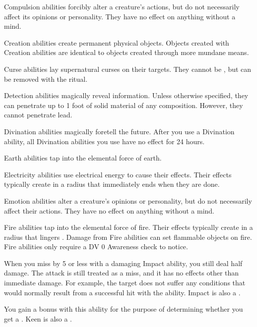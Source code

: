    Compulsion abilities forcibly alter a creature's actions, but do not necessarily affect its opinions or personality.
  They have no effect on anything without a mind.

   Creation abilities create permanent physical objects.
  Objects created with Creation abilities are identical to objects created through more mundane means.

   Curse abilities lay supernatural curses on their targets.
  They cannot be , but can be removed with the  ritual.

  \label{Detection} Detection abilities magically reveal information.
  Unless otherwise specified, they can penetrate up to 1 foot of solid material of any composition.
  However, they cannot penetrate lead.

  \label{Divination} Divination abilities magically foretell the future.
  After you use a Divination ability, all Divination abilities you use have no effect for 24 hours. 

   Earth abilities tap into the elemental force of earth.

   Electricity abilities use electrical energy to cause their effects.
  Their effects typically create  in a \smallarea radius that immediately ends when they are done.

   Emotion abilities alter a creature's opinions or personality, but do not necessarily affect their actions.
  They have no effect on anything without a mind.

   Fire abilities tap into the elemental force of fire.
  Their effects typically create  in a \smallarea radius that lingers \briefly.
  Damage from Fire abilities can set flammable objects on fire.
  Fire abilities only require a DV 0 Awareness check to notice.

   When you miss by 5 or less with a damaging Impact ability, you still deal half damage.
  The attack is still treated as a miss, and it has no effects other than immediate damage.
  For example, the target does not suffer any conditions that would normally result from a successful hit with the ability.
  Impact is also a .

   You gain a   bonus with this ability for the purpose of determining whether you get a .
  Keen is also a .

